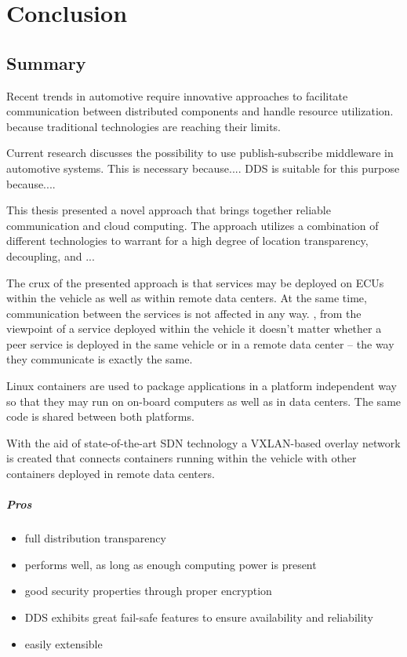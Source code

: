 
\chapter{Conclusion}\label{chapter:conclusion}

\section{Summary}

Recent trends in automotive require innovative approaches to facilitate communication between distributed components and handle resource utilization. because traditional technologies are reaching their limits. 

Current research discusses the possibility to use publish-subscribe middleware in automotive systems. This is necessary because.... DDS is suitable for this purpose because.... 

This thesis presented a novel approach that brings together reliable communication and cloud computing. The approach utilizes a combination of different technologies to warrant for a high degree of location transparency, decoupling,  and ...

The crux of the presented approach is that services may be deployed on ECUs within the vehicle as well as within remote data centers. At the same time, communication between the services is not affected in any way. \Ie , from the viewpoint of a service deployed within the vehicle it doesn't matter whether a peer service is deployed in the same vehicle or in a remote data center -- the way they communicate is exactly the same.


Linux containers are used to package applications in a platform independent way so that they may run on on-board computers as well as in data centers. The same code is shared between both platforms.

With the aid of state-of-the-art SDN technology a VXLAN-based overlay network is created that connects containers running within the vehicle with other containers deployed in remote data centers. 


\paragraph{Pros}
\begin{itemize}
	\item full distribution transparency
	\item performs well, as long as enough computing power is present
	\item good security properties through proper encryption
	\item DDS exhibits great fail-safe features to ensure availability and reliability
	\item easily extensible
\end{itemize}


